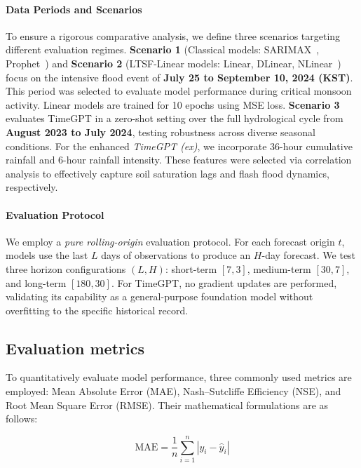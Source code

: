 \documentclass[a4paper,twoside,flushend, 10pt]{article}
\begin{document}
\paragraph{Data Periods and Scenarios}
To ensure a rigorous comparative analysis, we define three scenarios targeting different evaluation regimes. \textbf{Scenario 1} (Classical models: SARIMAX~\cite{BJ2015}, Prophet~\cite{TL2018}) and \textbf{Scenario 2} (LTSF-Linear models: Linear, DLinear, NLinear~\cite{ZCLX23}) focus on the intensive flood event of \textbf{July 25 to September 10, 2024 (KST)}. This period was selected to evaluate model performance during critical monsoon activity. Linear models are trained for 10 epochs using MSE loss. \textbf{Scenario 3} evaluates TimeGPT in a zero-shot setting over the full hydrological cycle from \textbf{August 2023 to July 2024}, testing robustness across diverse seasonal conditions. For the enhanced \textit{TimeGPT (ex)}, we incorporate 36-hour cumulative rainfall and 6-hour rainfall intensity. These features were selected via correlation analysis to effectively capture soil saturation lags and flash flood dynamics, respectively.

\paragraph{Evaluation Protocol}
We employ a \emph{pure rolling-origin} evaluation protocol. For each forecast origin $t$, models use the last $L$ days of observations to produce an $H$-day forecast. We test three horizon configurations $(L, H)$: short-term $[7, 3]$, medium-term $[30, 7]$, and long-term $[180, 30]$. For TimeGPT, no gradient updates are performed, validating its capability as a general-purpose foundation model without overfitting to the specific historical record.

\subsection{Evaluation metrics}

To quantitatively evaluate model performance, three commonly used metrics are employed: Mean Absolute Error (MAE), Nash–Sutcliffe Efficiency (NSE), and Root Mean Square Error (RMSE). Their mathematical formulations are as follows:

\begin{equation}
\text{MAE} = \frac{1}{n} \sum_{i=1}^{n} \left| y_i - \hat{y}_i \right|
\label{eq:mae}
\end{equation}
\end{document}

